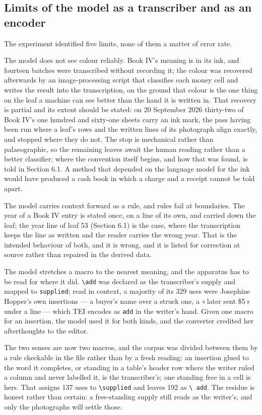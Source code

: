 \documentclass[11pt]{article}
\newcommand{\q}[1]{«\,#1\,»}
\begin{document}
\subsection{Limits of the model as a transcriber and as an encoder}

The experiment identified five limits, none of them a matter of error rate.

The model does not see colour reliably. Book IV's meaning is in its ink, and fourteen batches were transcribed without recording it; the colour was recovered afterwards by an image-processing script that classifies each money cell and writes the result into the transcription, on the ground that colour is the one thing on the leaf a machine can see better than the hand it is written in. That recovery is partial and its extent should be stated: on 20 September 2026 thirty-two of Book IV's one hundred and sixty-one sheets carry an ink mark, the pass having been run where a leaf's rows and the written lines of its photograph align exactly, and stopped where they do not. The stop is mechanical rather than palaeographic, so the remaining leaves await the human reading rather than a better classifier; where the convention itself begins, and how that was found, is told in Section 6.1. A method that depended on the language model for the ink would have produced a cash book in which a charge and a receipt cannot be told apart.

The model carries context forward as a rule, and rules fail at boundaries. The year of a Book IV entry is stated once, on a line of its own, and carried down the leaf; the year line of leaf 53 (Section 6.1) is the case, where the transcription keeps the line as written and the reader carries the wrong year. That is the intended behaviour of both, and it is wrong, and it is listed for correction at source rather than repaired in the derived data.

The model stretches a macro to the nearest meaning, and the apparatus has to
be read for where it did. \texttt{\textbackslash add} was declared as the
transcriber's supply and mapped to \texttt{supplied}; read in context, a
majority of its 329 uses were Josephine Hopper's own insertions --- a buyer's
name over a struck one, a \q{later sent \$5} under a line --- which TEI
encodes as \texttt{add} in the writer's hand. Given one macro for an
insertion, the model used it for both kinds, and the converter credited her
afterthoughts to the editor.

The two senses are now two macros, and the corpus was divided between them by
a rule checkable in the file rather than by a fresh reading: an insertion
glued to the word it completes, or standing in a table's header row where the
writer ruled a column and never labelled it, is the transcriber's; one
standing free in a cell is hers. That assigns 137 uses to
\texttt{\textbackslash supplied} and leaves 192 as \texttt{\textbackslash
add}. The residue is honest rather than certain: a free-standing supply still
reads as the writer's, and only the photographs will settle those.
\end{document}

